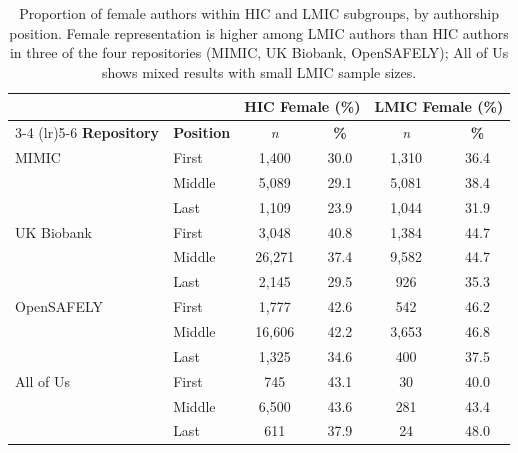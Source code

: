 \documentclass[11pt]{article}
\begin{document}
\begin{table}[H]
\centering
\caption{Proportion of female authors within HIC and LMIC subgroups, by authorship position. Female representation is higher among LMIC authors than HIC authors in three of the four repositories (MIMIC, UK Biobank, OpenSAFELY); All of Us shows mixed results with small LMIC sample sizes.}
\label{etab:intersectional}
\small
\begin{tabular}{@{}llcccc@{}}
\toprule
& & \multicolumn{2}{c}{\textbf{HIC Female (\%)}} & \multicolumn{2}{c}{\textbf{LMIC Female (\%)}} \\
\cmidrule(lr){3-4} \cmidrule(lr){5-6}
\textbf{Repository} & \textbf{Position} & \textit{n} & \textbf{\%} & \textit{n} & \textbf{\%} \\
\midrule
MIMIC & First & 1,400 & 30.0 & 1,310 & 36.4 \\
& Middle & 5,089 & 29.1 & 5,081 & 38.4 \\
& Last & 1,109 & 23.9 & 1,044 & 31.9 \\
\midrule
UK Biobank & First & 3,048 & 40.8 & 1,384 & 44.7 \\
& Middle & 26,271 & 37.4 & 9,582 & 44.7 \\
& Last & 2,145 & 29.5 & 926 & 35.3 \\
\midrule
OpenSAFELY & First & 1,777 & 42.6 & 542 & 46.2 \\
& Middle & 16,606 & 42.2 & 3,653 & 46.8 \\
& Last & 1,325 & 34.6 & 400 & 37.5 \\
\midrule
All of Us & First & 745 & 43.1 & 30 & 40.0 \\
& Middle & 6,500 & 43.6 & 281 & 43.4 \\
& Last & 611 & 37.9 & 24 & 48.0 \\
\bottomrule
\end{tabular}
\end{table}
\end{document}
